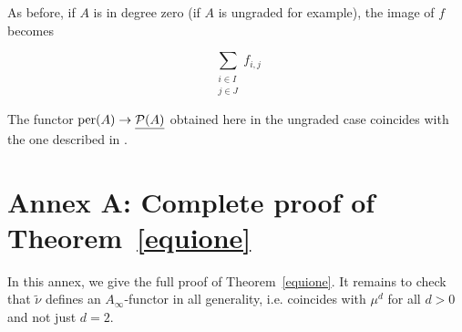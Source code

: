 \documentclass[12pt]{article}
\begin{document}
	\noindent As before, if $A$ is in degree zero (if $A$ is ungraded for example), the image of $f$ becomes
	
	\[\sum_{\substack{i \in I \\ j\in J}} f_{i,j}\]
	
	\begin{remark}
		The functor $\textup{per}(A) \to \underline{{\cal{P}}(A)}$ obtained here in the ungraded case coincides with the one described in \cite{Win}.
	\end{remark}
	
	\section{Annex A: Complete proof of Theorem~\ref{equione}}
	
	In this annex, we give the full proof of Theorem~\ref{equione}. It remains to check that $\tilde{\nu}$ defines an $A_\infty$-functor in all generality, i.e. coincides with $\mu^d$ for all $d >0$ and not just $d=2$.
	
\end{document}
